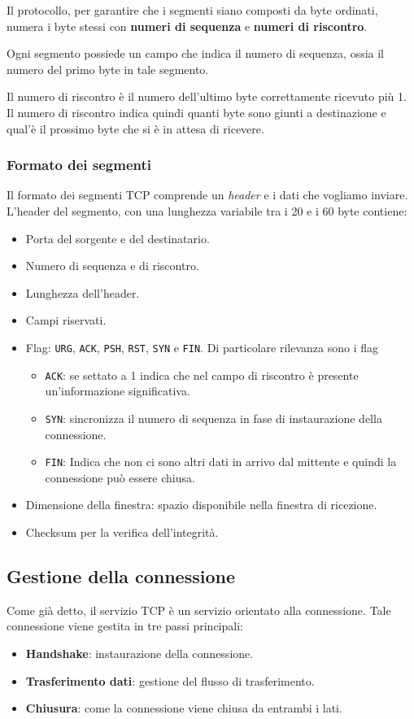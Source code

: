 Il protocollo, per garantire che i segmenti siano composti da byte 
ordinati, numera i byte stessi con \textbf{numeri di sequenza} e 
\textbf{numeri di riscontro}.

Ogni segmento possiede un campo che indica il numero di sequenza, ossia
il numero del primo byte in tale segmento.

Il numero di riscontro è il numero dell'ultimo byte correttamente 
ricevuto più 1. Il numero di riscontro indica quindi quanti byte sono
giunti a destinazione e qual'è il prossimo byte che si è in attesa di 
ricevere.

\subsubsection{Formato dei segmenti}
Il formato dei segmenti TCP comprende un \emph{header} e i dati che 
vogliamo inviare. L'header del segmento, con una lunghezza variabile 
tra i 20 e i 60 byte contiene:
\begin{itemize}
	\item Porta del sorgente e del destinatario.
	\item Numero di sequenza e di riscontro.
	\item Lunghezza dell'header.
	\item Campi riservati.
	\item Flag: \verb|URG|, \verb|ACK|, \verb|PSH|, \verb|RST|, 
		\verb|SYN| e \verb|FIN|. Di particolare rilevanza sono i flag
	      \begin{itemize}
		      \item \verb|ACK|: se settato a 1 indica che nel campo di
				  riscontro è presente un'informazione significativa.
		      \item \verb|SYN|: sincronizza il numero di sequenza in 
				  fase di instaurazione della connessione.
		      \item \verb|FIN|: Indica che non ci sono altri dati in 
				  arrivo dal mittente e quindi la connessione può 
				  essere chiusa.
	      \end{itemize}
	\item Dimensione della finestra: spazio disponibile nella finestra
		di ricezione.
	\item Checksum per la verifica dell'integrità.
\end{itemize}

\subsection{Gestione della connessione}
Come già detto, il servizio TCP è un servizio orientato alla 
connessione. Tale connessione viene gestita in tre passi principali:
\begin{itemize}
	\item \textbf{Handshake}: instaurazione della connessione.
	\item \textbf{Trasferimento dati}: gestione del flusso di 
		trasferimento.
	\item \textbf{Chiusura}: come la connessione viene chiusa da 
		entrambi i lati.
\end{itemize}

